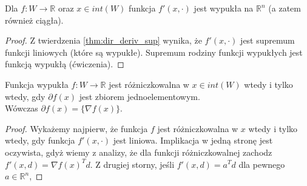 \documentclass[10pt,a4paper,draft]{report}
\begin{document}
\begin{corollary}
Dla $f : W \rightarrow \mathbb{R}$ oraz $x \in int(W)$ funkcja $f'(x, \cdot)$ jest wypukła na $\mathbb{R}^n$ (a zatem również ciągła).
\end{corollary}
\begin{proof}
Z twierdzenia \ref{thm:dir_deriv_sup} wynika, że $f'(x,\cdot)$ jest supremum funkcji liniowych (które są wypukłe). Supremum rodziny funkcji wypukłych jest funkcją wypukłą (ćwiczenia).
\end{proof}

\begin{corollary}
Funkcja wypukła $f: W \rightarrow \mathbb{R}$ jest różniczkowalna w $x\in int(W)$ wtedy i tylko wtedy, gdy $\partial f(x)$ jest zbiorem jednoelementowym. \\ Wówczas $\partial f(x) = \{ \nabla f(x) \}$.
\end{corollary}
\begin{proof}
Wykażemy najpierw, że funkcja $f$ jest różniczkowalna w $x$ wtedy i tylko wtedy, gdy funkcja $f'(x, \cdot)$ jest liniowa. Implikacja w jedną stronę jest oczywista, gdyż wiemy z analizy, że dla funkcji różniczkowalnej zachodz $f'(x,d) = \nabla f(x)^T d$. Z drugiej storny, jeśli $f'(x, d) = a^T d$ dla pewnego $a \in \mathbb{R}^n$, 
\end{proof}
\end{document}
